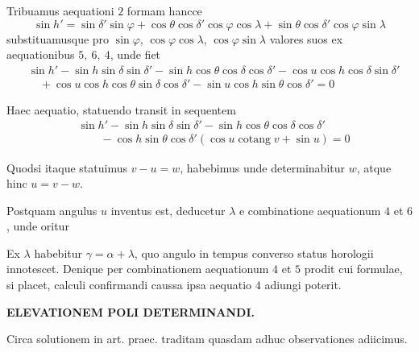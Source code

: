 Tribuamus aequationi $2$ formam hancce
\[
\sin h'=\sin\delta'\sin\varphi+\cos\theta\cos\delta'\cos\varphi\cos\lambda+\sin\theta\cos\delta'\cos\varphi\sin\lambda
\]
substituamusque pro $\sin\varphi$, $\cos\varphi\cos\lambda$, $\cos\varphi\sin\lambda$ valores suos ex aequationibus $5,\ 6,\ 4$, unde fiet
\[
\begin{aligned}
&\sin h'-\sin h\sin\delta\sin\delta'-\sin h\cos\theta\cos\delta\cos\delta'-\cos u\cos h\cos\delta\sin\delta'\\
&\quad+\cos u\cos h\cos\theta\sin\delta\cos\delta'-\sin u\cos h\sin\theta\cos\delta'=0
\end{aligned}
\]

Haec aequatio, statuendo
transit in sequentem
\[
\begin{aligned}
&\sin h'-\sin h\sin\delta\sin\delta'-\sin h\cos\theta\cos\delta\cos\delta'\\
&\qquad-\cos h\sin\theta\cos\delta'(\cos u\operatorname{cotang}v+\sin u)=0
\end{aligned}
\]

Quodsi itaque statuimus $v-u=w$, habebimus
unde determinabitur $w$, atque hinc $u=v-w$.

Postquam angulus $u$ inventus est, deducetur $\lambda$ e combinatione aequationum $4$ et $6$, unde oritur

Ex $\lambda$ habebitur $\gamma=\alpha+\lambda$, quo angulo in tempus converso status horologii innotescet. Denique per combinationem aequationum $4$ et $5$ prodit
cui formulae, si placet, calculi confirmandi caussa ipsa aequatio $4$ adiungi poterit.
\par
\clearpage
\thispagestyle{empty}
\noindent{}%
\makebox[12mm][l]{}%
\parbox[t]{\dimexpr\linewidth-24mm\relax}{\centering\footnotesize\bfseries ELEVATIONEM POLI DETERMINANDI.\par}%
\par\nobreak\medskip
{}
Circa solutionem in art. praec. traditam quasdam adhuc observationes adiicimus.

